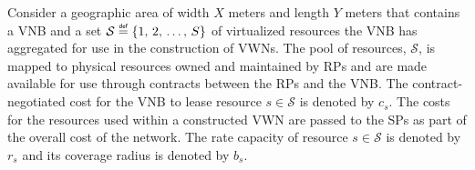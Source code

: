 \documentclass[12pt,dvipsnames]{report}
\newcommand\defeq{\mathrel{\overset{\makebox[0pt]{\mbox{\normalfont\tiny\sffamily def}}}{=}}}
\begin{document}
Consider a geographic area of width $X$ meters and length $Y$ meters that contains a VNB and a set $\mathcal{S} \defeq \left\{1,\, 2,\, \ldots,\, S\right\}$ of virtualized resources the VNB has aggregated for use in the construction of VWNs.  The pool of resources, $\mathcal{S}$, is mapped to physical resources owned and maintained by RPs and are made available for use through contracts between the RPs and the VNB.  The contract-negotiated cost for the VNB to lease resource $s \in \mathcal{S}$ is denoted by $c_s$.  The costs for the resources used within a constructed VWN are passed to the SPs as part of the overall cost of the network.  The rate capacity of resource $s \in \mathcal{S}$ is denoted by $r_s$ and its coverage radius is denoted by $b_s$.

\end{document}
